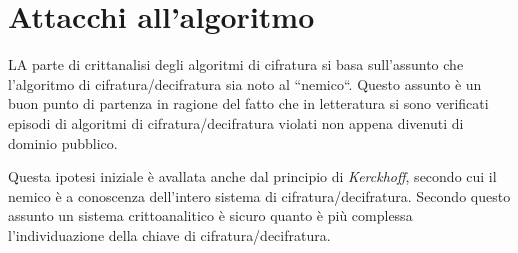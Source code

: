 \documentclass[11pt, a4paper, oneside]{Thesis} %
\begin{document}
\section{Attacchi all'algoritmo}
LA parte di crittanalisi degli algoritmi di cifratura si basa sull'assunto che l'algoritmo di cifratura/decifratura sia noto al ``nemico``. Questo assunto è un buon punto di partenza
in ragione del fatto che in letteratura si sono verificati episodi di algoritmi di cifratura/decifratura violati non appena divenuti di dominio pubblico.
\par Questa ipotesi iniziale è avallata anche dal principio di \textit{Kerckhoff}, secondo cui il nemico è a conoscenza dell'intero sistema di cifratura/decifratura.
Secondo questo assunto un sistema crittoanalitico è sicuro quanto è più complessa l'individuazione della chiave di cifratura/decifratura.
\end{document}
